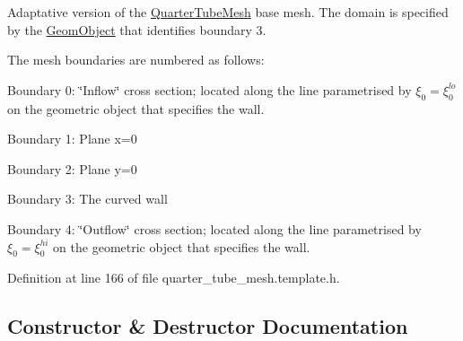 Adaptative version of the \hyperlink{classoomph_1_1QuarterTubeMesh}{Quarter\+Tube\+Mesh} base mesh. The domain is specified by the \hyperlink{classoomph_1_1GeomObject}{Geom\+Object} that identifies boundary 3.

The mesh boundaries are numbered as follows\+:
\begin{DoxyItemize}
\item Boundary 0\+: \char`\"{}\+Inflow\char`\"{} cross section; located along the line parametrised by $ \xi_0 = \xi_0^{lo} $ on the geometric object that specifies the wall.
\item Boundary 1\+: Plane x=0
\item Boundary 2\+: Plane y=0
\item Boundary 3\+: The curved wall
\item Boundary 4\+: \char`\"{}\+Outflow\char`\"{} cross section; located along the line parametrised by $ \xi_0 = \xi_0^{hi} $ on the geometric object that specifies the wall. 
\end{DoxyItemize}

Definition at line 166 of file quarter\+\_\+tube\+\_\+mesh.\+template.\+h.



\subsection{Constructor \& Destructor Documentation}
\mbox{\label{classoomph_1_1RefineableQuarterTubeMesh_a8aaace5bc465614ace0a9117b3ee169c}} 
